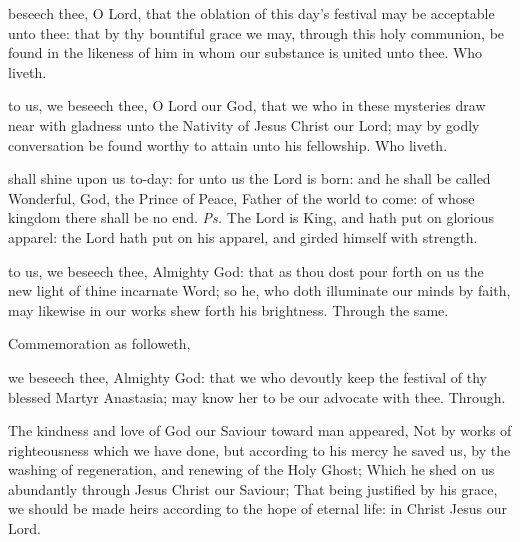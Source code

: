  beseech thee, O Lord, that the oblation of this day's festival may be acceptable unto thee: that by thy bountiful grace we may, through this holy communion, be found in the likeness of him in whom our substance is united unto thee. Who liveth.


\postcommunion
{} to us, we beseech thee, O Lord our God, that we who in these mysteries draw near with gladness unto the Nativity of Jesus Christ our Lord; may by godly conversation be found worthy to attain unto his fellowship. Who liveth.




\introit
{} shall shine upon us to-day: for unto us the Lord is born: and he shall be called Wonderful, God, the Prince of Peace, Father of the world to come: of whose kingdom there shall be no end. \textit{Ps.} The Lord is King, and hath put on glorious apparel: the Lord hath put on his apparel, and girded himself with strength.

\collect
{} to us, we beseech thee, Almighty God: that as thou dost pour forth on us the new light of thine incarnate Word; so he, who doth illuminate our minds by faith, may likewise in our works shew forth his brightness. Through the same.
\begin{rubric}
	Commemoration  as followeth,
\end{rubric}
 we beseech thee, Almighty God: that we who devoutly keep the festival of thy blessed Martyr Anastasia; may know her to be our advocate with thee. Through.

 The kindness and love of God our Saviour toward man appeared, Not by works of righteousness which we have done, but according to his mercy he saved us, by the washing of regeneration, and renewing of the Holy Ghost; Which he shed on us abundantly through Jesus Christ our Saviour; That being justified by his grace, we should be made heirs according to the hope of eternal life: in Christ Jesus our Lord.

